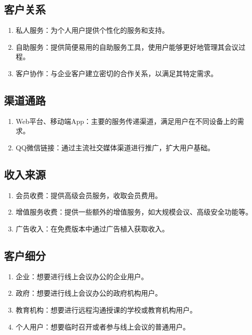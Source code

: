 \documentclass[a4paper,12pt]{article}
\begin{document}
    \subsection{客户关系}
    \begin{enumerate}
        \item 私人服务：为个人用户提供个性化的服务和支持。
        \item 自助服务：提供简便易用的自助服务工具，使用户能够更好地管理其会议过程。
        \item 客户协作：与企业客户建立密切的合作关系，以满足其特定需求。
    \end{enumerate}

    \subsection{渠道通路}
    \begin{enumerate}
        \item Web平台、移动端App：主要的服务传递渠道，满足用户在不同设备上的需求。
        \item QQ微信链接：通过主流社交媒体渠道进行推广，扩大用户基础。
    \end{enumerate}

    \subsection{收入来源}
    \begin{enumerate}
        \item 会员收费：提供高级会员服务，收取会员费用。
        \item 增值服务收费：提供一些额外的增值服务，如大规模会议、高级安全功能等。
        \item 广告收入：在免费版本中通过广告植入获取收入。
    \end{enumerate}

    \subsection{客户细分}
    \begin{enumerate}
        \item 企业：想要进行线上会议办公的企业用户。
        \item 政府：想要进行线上会议办公的政府机构用户。
        \item 教育机构：想要进行远程沟通授课的学校或教育机构用户。
        \item 个人用户：想要临时召开或者参与线上会议的普通用户。
    \end{enumerate}
\end{document}
